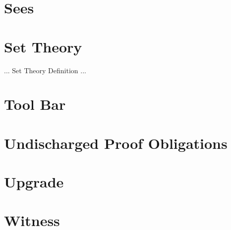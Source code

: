
\section{Sees}
\label{sees}

\section{Set Theory}
\label{set_theory}

... Set Theory Definition ...

\section{Tool Bar}
\label{tool_bar}

\section{Undischarged Proof Obligations}
\label{undischarged_proof_obligations}

\section{Upgrade}
\label{Upgrade}


\section{Witness}
\label{witness}



